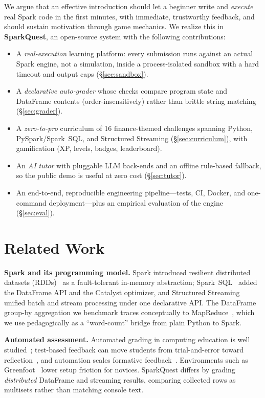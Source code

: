 \documentclass[10pt,twocolumn,letterpaper]{article}
\begin{document}
We argue that an effective introduction should let a beginner write and
\emph{execute} real Spark code in the first minutes, with immediate, trustworthy
feedback, and should sustain motivation through game mechanics. We realize this in
\textbf{SparkQuest}, an open-source system with the following contributions:

\begin{itemize}
  \item A \emph{real-execution} learning platform: every submission runs against an
  actual Spark engine, not a simulation, inside a process-isolated sandbox with a
  hard timeout and output caps (\S\ref{sec:sandbox}).
  \item A \emph{declarative auto-grader} whose checks compare program state and
  DataFrame contents (order-insensitively) rather than brittle string matching
  (\S\ref{sec:grader}).
  \item A \emph{zero-to-pro} curriculum of 16 finance-themed challenges spanning
  Python, PySpark/Spark~SQL, and Structured Streaming (\S\ref{sec:curriculum}),
  with gamification (XP, levels, badges, leaderboard).
  \item An \emph{AI tutor} with pluggable LLM back-ends and an offline rule-based
  fallback, so the public demo is useful at zero cost (\S\ref{sec:tutor}).
  \item An end-to-end, reproducible engineering pipeline---tests, CI, Docker, and
  one-command deployment---plus an empirical evaluation of the engine
  (\S\ref{sec:eval}).
\end{itemize}

\section{Related Work}
\textbf{Spark and its programming model.} Spark introduced resilient distributed
datasets (RDDs)~\cite{zaharia2012rdd} as a fault-tolerant in-memory abstraction;
Spark~SQL~\cite{armbrust2015sparksql} added the DataFrame API and the Catalyst
optimizer, and Structured Streaming~\cite{armbrust2018streaming} unified batch and
stream processing under one declarative API. The DataFrame group-by aggregation we
benchmark traces conceptually to MapReduce~\cite{dean2004mapreduce}, which we use
pedagogically as a ``word-count'' bridge from plain Python to Spark.

\textbf{Automated assessment.} Automated grading in computing education is
well studied~\cite{paiva2022automated}; test-based feedback can move students from
trial-and-error toward reflection~\cite{edwards2004testing}, and automation scales
formative feedback~\cite{wilcox2015automation}. Environments such as
Greenfoot~\cite{kolling2010greenfoot} lower setup friction for novices. SparkQuest
differs by grading \emph{distributed} DataFrame and streaming results, comparing
collected rows as multisets rather than matching console text.
\end{document}
